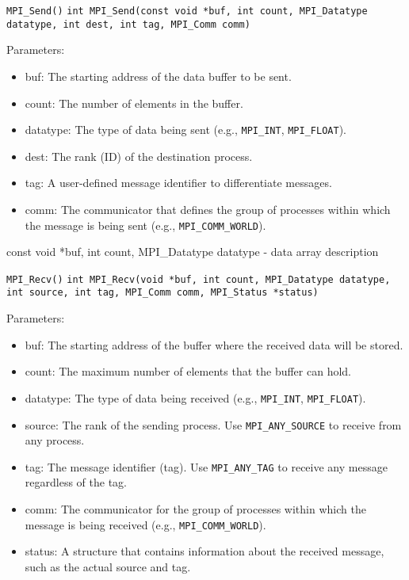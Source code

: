 \documentclass{beamer}
\begin{document}
\begin{frame}[fragile]{\texttt{MPI\_Send()}}
  \texttt{int MPI\_Send(const void *buf, int count, MPI\_Datatype datatype, int dest, int tag, MPI\_Comm comm)}

  Parameters:

  \begin{itemize}
    \item buf: The starting address of the data buffer to be sent.
    \item count: The number of elements in the buffer.
    \item datatype: The type of data being sent (e.g., \texttt{MPI\_INT}, \texttt{MPI\_FLOAT}).
    \item dest: The rank (ID) of the destination process.
    \item tag: A user-defined message identifier to differentiate messages.
    \item comm: The communicator that defines the group of processes within which the message is being sent (e.g., \texttt{MPI\_COMM\_WORLD}).
  \end{itemize}

  const void *buf, int count, MPI\_Datatype datatype - data array description
\end{frame}

\begin{frame}[fragile]{\texttt{MPI\_Recv()}}
  \texttt{int MPI\_Recv(void *buf, int count, MPI\_Datatype datatype, int source, int tag, MPI\_Comm comm, MPI\_Status *status)}

  Parameters:

  \begin{itemize}
    \item buf: The starting address of the buffer where the received data will be stored.
    \item count: The maximum number of elements that the buffer can hold.
    \item datatype: The type of data being received (e.g., \texttt{MPI\_INT}, \texttt{MPI\_FLOAT}).
    \item source: The rank of the sending process. Use \texttt{MPI\_ANY\_SOURCE} to receive from any process.
    \item tag: The message identifier (tag). Use \texttt{MPI\_ANY\_TAG} to receive any message regardless of the tag.
    \item comm: The communicator for the group of processes within which the message is being received (e.g., \texttt{MPI\_COMM\_WORLD}).
    \item status: A structure that contains information about the received message, such as the actual source and tag.
  \end{itemize}
\end{frame}
\end{document}

